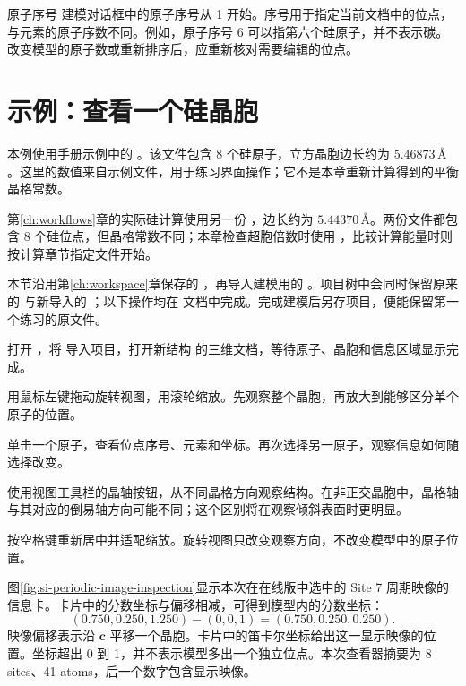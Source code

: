 \begin{notebox}{原子序号}
建模对话框中的原子序号从 1 开始。序号用于指定当前文档中的位点，与元素的原子序数不同。例如，原子序号 6 可以指第六个硅原子，并不表示碳。改变模型的原子数或重新排序后，应重新核对需要编辑的位点。
\end{notebox}

\section{示例：查看一个硅晶胞}

本例使用手册示例中的 \mbox{}。该文件包含 8 个硅原子，立方晶胞边长约为 $5.46873\,\text{\AA}$。这里的数值来自示例文件，用于练习界面操作；它不是本章重新计算得到的平衡晶格常数。

第\ref{ch:workflows}章的实际硅计算使用另一份 ，边长约为 $5.44370\,\text{\AA}$。两份文件都包含 8 个硅位点，但晶格常数不同；本章检查超胞倍数时使用 \mbox{}，比较计算能量时则按计算章节指定文件开始。

本节沿用第\ref{ch:workspace}章保存的 ，再导入建模用的 。项目树中会同时保留原来的  与新导入的 ；以下操作均在  文档中完成。完成建模后另存项目，便能保留第一个练习的原文件。

\begin{steps}
  \item 打开 ，将  导入项目，打开新结构  的三维文档，等待原子、晶胞和信息区域显示完成。
  \item 用鼠标左键拖动旋转视图，用滚轮缩放。先观察整个晶胞，再放大到能够区分单个原子的位置。
  \item 单击一个原子，查看位点序号、元素和坐标。再次选择另一原子，观察信息如何随选择改变。
  \item 使用视图工具栏的晶轴按钮，从不同晶格方向观察结构。在非正交晶胞中，晶格轴与其对应的倒易轴方向可能不同；这个区别将在观察倾斜表面时更明显。
  \item 按空格键重新居中并适配缩放。旋转视图只改变观察方向，不改变模型中的原子位置。
\end{steps}

图\ref{fig:si-periodic-image-inspection}显示本次在在线版中选中的 Site 7 周期映像的信息卡。卡片中的分数坐标与偏移相减，可得到模型内的分数坐标：
\[
 (0.750,0.250,1.250)-(0,0,1)=(0.750,0.250,0.250).
\]
映像偏移表示沿 $\mathbf c$ 平移一个晶胞。卡片中的笛卡尔坐标给出这一显示映像的位置。坐标超出 0 到 1，并不表示模型多出一个独立位点。本次查看器摘要为 8 sites、41 atoms，后一个数字包含显示映像。


